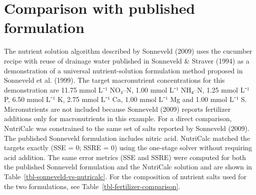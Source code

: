 \documentclass[
  letterpaper,
  DIV=11,
  numbers=noendperiod]{scrreprt}
\begin{document}
\begin{table}

\caption{\label{tbl-kcl-ec-comparison}Electrical conductivity of KCl
solutions at 25 °C.}


\end{table}%

\section{Comparison with published
formulation}\label{comparison-with-published-formulation}

The nutrient solution algorithm described by Sonneveld (2009) uses the
cucumber recipe with reuse of drainage water published in Sonneveld \&
Straver (1994) as a demonstration of a universal nutrient-solution
formulation method proposed in Sonneveld et al. (1999). The target
macronutrient concentrations for this demonstration are 11.75 mmol L⁻¹
NO₃--N, 1.00 mmol L⁻¹ NH₄--N, 1.25 mmol L⁻¹ P, 6.50 mmol L⁻¹ K, 2.75
mmol L⁻¹ Ca, 1.00 mmol L⁻¹ Mg and 1.00 mmol L⁻¹ S. Micronutrients are
not included because Sonneveld (2009) reports fertilizer additions only
for macronutrients in this example. For a direct comparison, NutriCalc
was constrained to the same set of salts reported by Sonneveld (2009).
The published Sonneveld formulation includes nitric acid. NutriCalc
matched the targets exactly (SSE = 0; SSRE = 0) using the one-stage
solver without requiring acid addition. The same error metrics (SSE and
SSRE) were computed for both the published Sonneveld formulation and the
NutriCalc solution and are shown in
Table~\ref{tbl-sonneveld-vs-nutricalc}. For the composition of nutrient
salts used for the two formulations, see
Table~\ref{tbl-fertilizer-comparison}.
\end{document}

